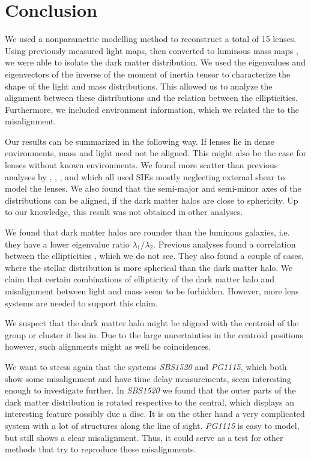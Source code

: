 \documentclass[10pt]{article}
\begin{document}
\clearpage
\section{Conclusion}\label{sec:conclusion}
We used a nonparametric modelling method to reconstruct a total of 15 lenses. Using previously measured light maps, then converted to luminous mass maps \cite{leier11phd}, we were able to isolate the dark matter distribution. We used the eigenvalues and eigenvectors of the inverse of the moment of inertia tensor to characterize the shape of the light and mass distributions. This allowed us to analyze the alignment between these distributions and the relation between the ellipticities. Furthermore, we included environment information, which we related the to the misalignment.

Our results can be summarized in the following way. If lenses lie in dense environments, mass and light need not be aligned. This might also be the case for lenses without known environments. We found more scatter than previous analyses by \cite{1997ApJ...482..604K}, \cite{2006ApJ...649..599K}, \cite{2009ApJ...690..670T}, and \cite{2012ApJ...761..170G} which all used SIEs mostly neglecting external shear to model the lenses. We also found that the semi-major and semi-minor axes of the distributions can be aligned, if the dark matter halos are close to sphericity. Up to our knowledge, this result was not obtained in other analyses.

We found that dark matter halos are rounder than the luminous galaxies, i.e. they have a lower eigenvalue ratio $\lambda_{1}/\lambda_{2}$. Previous analyses found a correlation between the ellipticities \citep{2009ApJ...690..670T,2012ApJ...761..170G}, which we do not see. They also found a couple of cases, where the stellar distribution is more spherical than the dark matter halo. We claim that certain combinations of ellipticity of the dark matter halo and misalignment between light and mass seem to be forbidden. However, more lens systems are needed to support this claim.

We suspect that the dark matter halo might be aligned with the centroid of the group or cluster it lies in. Due to the large uncertainties in the centroid positions however, such alignments might as well be coincidences.

We want to stress again that the systems \textit{SBS1520} and \textit{PG1115}, which both show some misalignment and have time delay measurements, seem interesting enough to investigate further. In \textit{SBS1520} we found that the outer parts of the dark matter distribution is rotated respective to the central, which displays an interesting feature possibly due a disc. It is on the other hand a very complicated system with a lot of structures along the line of sight. \textit{PG1115} is easy to model, but still shows a clear misalignment. Thus, it could serve as a test for other methods that try to reproduce these misalignments.
\end{document}
